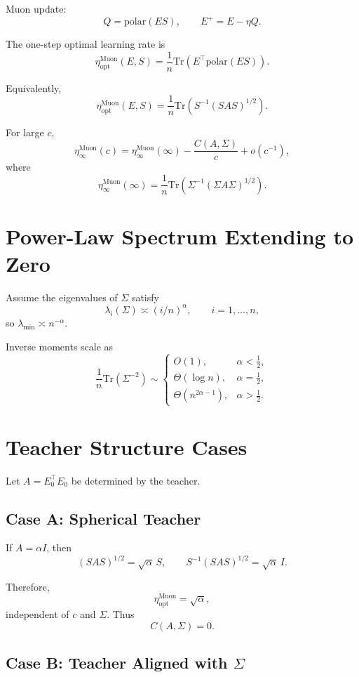 \documentclass[11pt]{article}
\begin{document}
Muon update:
\[
Q = \mathrm{polar}(ES),
\qquad
E^+ = E - \eta Q.
\]

The one-step optimal learning rate is
\[
\eta_{\mathrm{opt}}^{\mathrm{Muon}}(E,S)
=
\frac{1}{n}
\mathrm{Tr}
\left(
E^\top \mathrm{polar}(ES)
\right).
\]

Equivalently,
\[
\eta_{\mathrm{opt}}^{\mathrm{Muon}}(E,S)
=
\frac{1}{n}
\mathrm{Tr}
\left(
S^{-1}(SAS)^{1/2}
\right).
\]

For large $c$,
\[
\eta_\infty^{\mathrm{Muon}}(c)
=
\eta_\infty^{\mathrm{Muon}}(\infty)
-
\frac{C(A,\Sigma)}{c}
+ o(c^{-1}),
\]
where
\[
\eta_\infty^{\mathrm{Muon}}(\infty)
=
\frac{1}{n}
\mathrm{Tr}
\left(
\Sigma^{-1}
(\Sigma A \Sigma)^{1/2}
\right).
\]

\section{Power-Law Spectrum Extending to Zero}

Assume the eigenvalues of $\Sigma$ satisfy
\[
\lambda_i(\Sigma) \asymp (i/n)^\alpha,
\qquad i=1,\dots,n,
\]
so $\lambda_{\min} \asymp n^{-\alpha}$.

Inverse moments scale as
\[
\frac{1}{n}\mathrm{Tr}(\Sigma^{-2})
\sim
\begin{cases}
O(1), & \alpha < \tfrac12,\\
\Theta(\log n), & \alpha = \tfrac12,\\
\Theta(n^{2\alpha-1}), & \alpha > \tfrac12.
\end{cases}
\]

\section{Teacher Structure Cases}

Let $A = E_0^\top E_0$ be determined by the teacher.

\subsection*{Case A: Spherical Teacher}

If $A = \alpha I$, then
\[
(SAS)^{1/2} = \sqrt{\alpha}\, S,
\qquad
S^{-1}(SAS)^{1/2} = \sqrt{\alpha}\, I.
\]

Therefore,
\[
\eta_{\mathrm{opt}}^{\mathrm{Muon}} = \sqrt{\alpha},
\]
independent of $c$ and $\Sigma$.
Thus
\[
C(A,\Sigma) = 0.
\]

\subsection*{Case B: Teacher Aligned with $\Sigma$}
\end{document}
